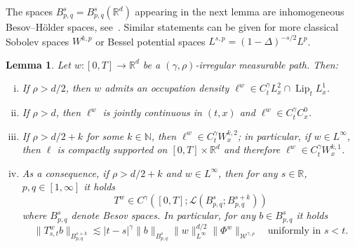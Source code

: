 \documentclass[10pt]{article}
\newcommand{\tmop}[1]{\ensuremath{\operatorname{#1}}}
\newenvironment{enumerateroman}{\begin{enumerate}[i.] }{\end{enumerate}}
\newtheorem{lemma}[theorem]{Lemma}
\begin{document}
The spaces $B^s_{p, q} = B^s_{p, q} (\mathbb{R}^d)$ appearing in the next
lemma are inhomogeneous Besov--H\"{o}lder spaces, see~{\cite{bahouri}}.
Similar statements can be given for more classical Sobolev spaces $W^{k, p}$
or Bessel potential spaces $L^{s, p} = (1 - \Delta)^{- s / 2} L^p$.

\begin{lemma}
  \label{sec2.2 lemma regularity averaging 2}Let $w : [0, T] \rightarrow
  \mathbb{R}^d$ be a $(\gamma, \rho)$\mbox{-}irregular measurable path. Then:
  \begin{enumerateroman}
    \item If $\rho > d / 2$, then $w$ admits an occupation density $\ell^w \in
    C^{\gamma}_t L^2_x \cap \tmop{Lip}_t L^1_x$.
    
    \item If $\rho > d$, then $\ell^w$ is jointly continuous in $(t, x)$ and
    $\ell^w \in C^{\gamma}_t C^0_x$.
    
    \item If $\rho > d / 2 + k$ for some $k \in \mathbb{N}$, then $\ell^w \in
    C^{\gamma}_t W^{k, 2}_x$; in particular, if $w \in L^{\infty}$, then
    $\ell$ is compactly supported on $[0, T] \times \mathbb{R}^d$ and
    therefore $\ell^w \in C^{\gamma}_t W^{k, 1}_x$.
    
    \item As a consequence, if $\rho > d / 2 + k$ and $w \in L^{\infty}$, then
    for any $s \in \mathbb{R}$, $p, q \in [1, \infty]$ it holds
    \[ T^w \in C^{\gamma} ([0, T] ; \mathcal{L} (B^s_{p, q} ; B^{s + k}_{p,
       q})) \]
    where $B^s_{p, q}$ denote Besov spaces. In particular, for any $b \in
    B^s_{p, q}$ it holds
    \[ \| T^w_{s, t} b \|_{B^{s + k}_{p, q}} \lesssim | t - s |^{\gamma} \| b
       \|_{B^s_{p, q}} \| w \|_{L^{\infty}}^{d / 2} \| \Phi^w
       \|_{\mathcal{W}^{\gamma, \rho}} \quad \text{uniformly in } s < t. \]
  \end{enumerateroman}
\end{lemma}
\end{document}
